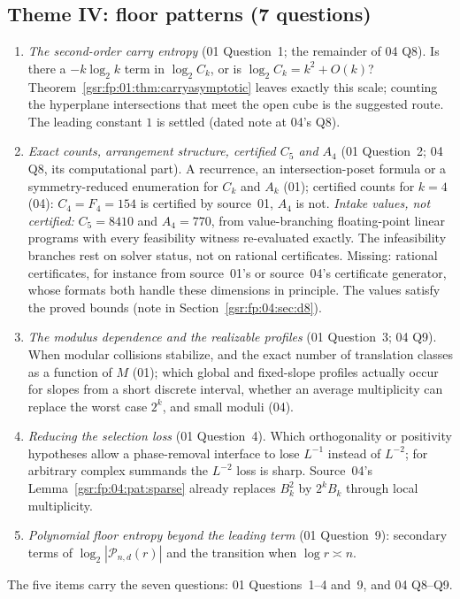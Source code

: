 \documentclass[11pt,letterpaper]{article}
\numberwithin{equation}{section}
\theoremstyle{definition}
\theoremstyle{remark}
\newcommand{\1}{\mathbf 1}
\begin{document}
\subsection*{Theme IV: floor patterns (7 questions)}
\begin{enumerate}[label=\textbf{IV.\arabic*},ref=IV.\arabic*,leftmargin=2.6em]
\item\label{gsr:fz:q:IV:second} \emph{The second-order carry entropy} (01 Question~1; the remainder of 04 Q8). Is there a $-k\log_2k$ term in $\log_2C_k$, or is $\log_2C_k=k^2+O(k)$? Theorem~\ref{gsr:fp:01:thm:carryasymptotic} leaves exactly this scale; counting the hyperplane intersections that meet the open cube is the suggested route. The leading constant $1$ is settled (dated note at 04's Q8).
\item\label{gsr:fz:q:IV:counts} \emph{Exact counts, arrangement structure, certified $C_5$ and $A_4$} (01 Question~2; 04 Q8, its computational part). A recurrence, an intersection-poset formula or a symmetry-reduced enumeration for $C_k$ and $A_k$ (01); certified counts for $k=4$ (04): $C_4=F_4=154$ is certified by source~01, $A_4$ is not. \emph{Intake values, not certified:} $C_5=8410$ and $A_4=770$, from value-branching floating-point linear programs with every feasibility witness re-evaluated exactly. The infeasibility branches rest on solver status, not on rational certificates. Missing: rational certificates, for instance from source~01's or source~04's certificate generator, whose formats both handle these dimensions in principle. The values satisfy the proved bounds (note in Section~\ref{gsr:fp:04:sec:d8}).
\item\label{gsr:fz:q:IV:modulus} \emph{The modulus dependence and the realizable profiles} (01 Question~3; 04 Q9). When modular collisions stabilize, and the exact number of translation classes as a function of $M$ (01); which global and fixed-slope profiles actually occur for slopes from a short discrete interval, whether an average multiplicity can replace the worst case $2^k$, and small moduli (04).
\item\label{gsr:fz:q:IV:selection} \emph{Reducing the selection loss} (01 Question~4). Which orthogonality or positivity hypotheses allow a phase-removal interface to lose $L^{-1}$ instead of $L^{-2}$; for arbitrary complex summands the $L^{-2}$ loss is sharp. Source~04's Lemma~\ref{gsr:fp:04:pat:sparse} already replaces $B_k^2$ by $2^kB_k$ through local multiplicity.
\item\label{gsr:fz:q:IV:poly} \emph{Polynomial floor entropy beyond the leading term} (01 Question~9): secondary terms of $\log_2|\mathcal P_{n,d}(r)|$ and the transition when $\log r\asymp n$.
\end{enumerate}
The five items carry the seven questions: 01 Questions~1--4 and~9, and 04 Q8--Q9.
\end{document}
